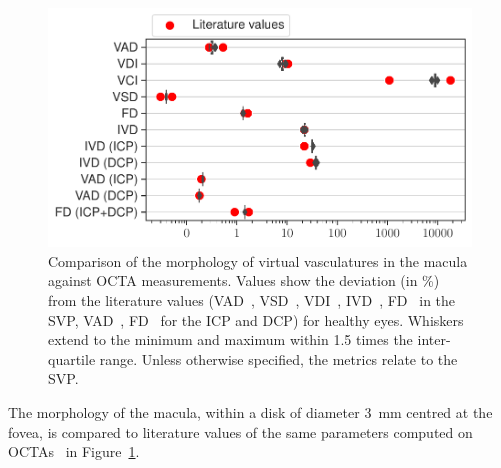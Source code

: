 \documentclass[11pt,]{article}
\begin{document}
\begin{figure}[ht!]
  \centering
  \includegraphics[width=.75\textwidth]{Baseline_metrics}
  \caption{\label{fig:OCTAValidation}Comparison of the morphology of virtual vasculatures in the macula against OCTA measurements. Values show the deviation (in \%) from the literature values (VAD~\cite{Mehta_2019}, VSD~\cite{Mehta_2019}, VDI~\cite{Mehta_2020}, IVD~\cite{Liu_2021}, FD~\cite{Agarwal_2019,Ma2021} in the SVP, VAD~\cite{Chan2012}, FD~\cite{Agarwal_2019,Ma2021} for the ICP and DCP) for healthy eyes. Whiskers extend to the minimum and maximum within \SI{1.5}{} times the inter-quartile range. Unless otherwise specified, the metrics relate to the SVP.}  
\end{figure}

The morphology of the macula, within a disk of diameter \SI{3}{\mm} centred at the fovea, is compared to literature values of the same parameters computed on OCTAs~\cite{Chu2016,Liu_2021,Ma2021} in Figure~\ref{fig:OCTAValidation}.
\end{document}
